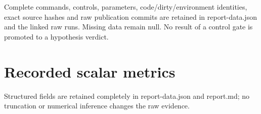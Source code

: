 \documentclass[10pt]{article}
\begin{document}
Complete commands, controls, parameters, code/dirty/environment identities, exact source hashes and raw publication commits are retained in report-data.json and the linked raw runs. Missing data remain null. No result of a control gate is promoted to a hypothesis verdict.
\newpage
\section*{Recorded scalar metrics}

Structured fields are retained completely in report-data.json and report.md; no truncation or numerical inference changes the raw evidence.
\end{document}
